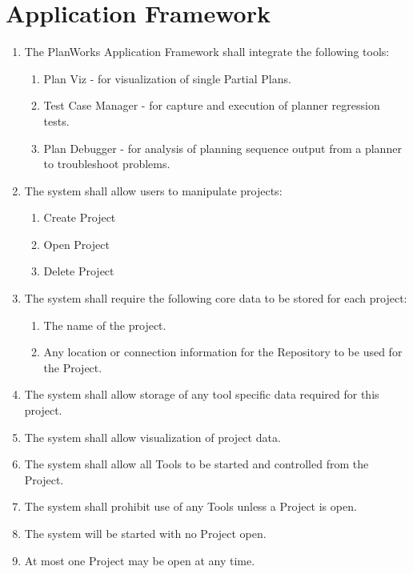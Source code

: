\documentclass[twoside, 11pt]{article}
\begin{document}
\section{Application Framework}
\begin{enumerate}
\item The PlanWorks Application Framework shall integrate the following tools:
\begin{enumerate}
\item Plan Viz - for visualization of single Partial Plans.
\item Test Case Manager - for capture and execution of planner regression tests.
\item Plan Debugger - for analysis of planning sequence output from a planner to troubleshoot problems.
\end{enumerate}
\item The system shall allow users to manipulate projects:
\begin{enumerate}
\item Create Project
\item Open Project
\item Delete Project
\end{enumerate}
\item The system shall require the following core data to be stored for each project:
\begin{enumerate}
\item The name of the project. 
\item Any location or connection information for the Repository to be used for the Project.
\end{enumerate}
\item The system shall allow storage of any tool specific data required for this project.
\item The system shall allow visualization of project data.
\item The system shall allow all Tools to be started and controlled from the Project.
\item The system shall prohibit use of any Tools unless a Project is open.
\item The system will be started with no Project open.
\item At most one Project may be open at any time.
\end{enumerate}
\end{document}
